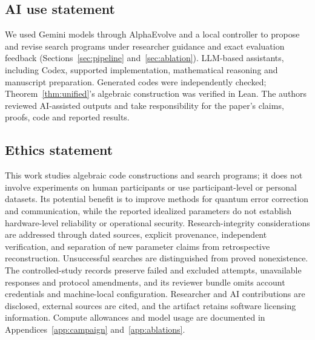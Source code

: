 \subsection*{AI use statement}
We used Gemini models through AlphaEvolve and a local controller to
propose and revise search programs under researcher guidance and exact
evaluation feedback (Sections~\ref{sec:pipeline} and~\ref{sec:ablation}).
LLM-based assistants, including Codex, supported implementation,
mathematical reasoning and manuscript preparation. Generated codes were
independently checked; Theorem~\ref{thm:unified}'s algebraic construction
was verified in Lean. The authors reviewed AI-assisted outputs and take
responsibility for the paper's claims, proofs, code and reported results.

\subsection*{Ethics statement}
This work studies algebraic code constructions and search programs;
it does not involve experiments on human participants or use
participant-level or personal datasets. Its potential benefit is to
improve methods for quantum error correction and communication, while
the reported idealized parameters do not establish hardware-level
reliability or operational security. Research-integrity considerations
are addressed through dated sources, explicit provenance, independent
verification, and separation of new parameter claims from retrospective
reconstruction. Unsuccessful searches are distinguished from proved
nonexistence. The controlled-study records preserve failed and excluded
attempts, unavailable responses and protocol amendments, and its reviewer
bundle omits account credentials and machine-local configuration.
Researcher and AI contributions are disclosed, external sources are
cited, and the artifact retains software licensing information. Compute
allowances and model usage are documented in Appendices~\ref{app:campaign}
and~\ref{app:ablations}.

